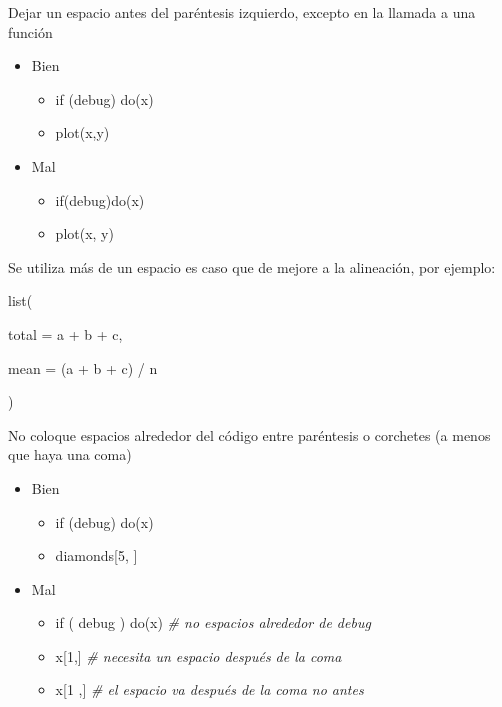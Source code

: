 \begin{enumerate}
Dejar un espacio antes del paréntesis izquierdo, excepto en la llamada a una función

\begin{itemize}
\item Bien  
\begin{itemize}
     \item if (debug) do(x)
     \item plot(x,y)
  \end{itemize}
\item Mal
   \begin{itemize}
      \item if(debug)do(x)
     \item plot(x, y)
   \end{itemize}
 \end{itemize}

Se utiliza más de un espacio es caso que de mejore a la alineación, por ejemplo:\\
\begin{list}{}{}
\item list(
    \begin{list}{}{} 
       \item total \hspace{3mm}= a + b + c,
       \item mean \hspace{2mm}= (a + b + c) / n
    \end{list}
\item )
\end{list}
No coloque espacios alrededor del código entre paréntesis o corchetes (a menos que haya una coma)
\begin{itemize}
\item Bien  
\begin{itemize}
     \item if (debug)  do(x)
     \item diamonds[5, ]
  \end{itemize}
\item Mal
   \begin{itemize}
      \item if ( debug ) do(x) \textit{\# no espacios alrededor de debug}
      \item x[1,] \textit{\# necesita un espacio después de la coma}
      \item x[1 ,] \textit{\# el espacio va después de la coma no antes}	   
\end{itemize}
 \end{itemize}


\end{enumerate}
